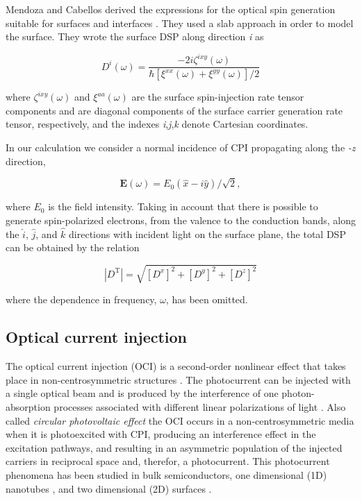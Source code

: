 \documentclass[aps,pra,11pt,tightenlines,showpacs,superscriptaddress,groupedaddress]{revtex4-1}
\begin{document}
Mendoza and Cabellos derived the expressions for the optical spin generation
suitable for surfaces and interfaces \cite{mendoza2012optical}. They used a
slab approach in order to model the surface. They wrote the surface DSP along
direction \emph{i} as

\begin{equation}
    D^{i}(\omega) = \frac{-2i \zeta^{ixy} (\omega)}{\hbar \left[
    \xi^{xx}(\omega) + \xi^{yy}(\omega) \right] /2 } \label{eq:D^i}
\end{equation}

\noindent where $\zeta^{ixy} (\omega)$ and $\xi^{aa}(\omega)$ are the surface
spin-injection rate tensor components and are diagonal components of the
surface carrier generation rate tensor, respectively, and the indexes
\emph{i},\emph{j},\emph{k} denote Cartesian coordinates.

In our calculation we consider a normal incidence of CPI propagating along the
\emph{-z} direction,

\begin{equation*}
    \mathbf{E} (\omega) = E_{0}(\hat{x} -i \hat{y})/\sqrt{2}, 
\end{equation*}


\noindent where $E_{0}$ is the field intensity. Taking in account that there is
possible to generate spin-polarized electrons, from the valence to the
conduction bands, along the $\hat{i}$, $\hat{j}$, and $\hat{k}$ directions with
incident light on the surface plane, the total DSP can be obtained by the
relation

\begin{equation*}
    |{D^{\text{T}}}| = \sqrt{ \left[ D^{x} \right]^{2} + \left[ D^{y}
    \right]^{2} + \left[ D^{z} \right]^{2} }
\end{equation*}

\noindent where the dependence in frequency, $\omega$, has been omitted.

    \subsection{Optical current injection}

The optical current injection (OCI) is a second-order nonlinear effect that
takes place in non-centrosymmetric structures \cite{nastos2006optical,
cabellos2011optical,bhat2005excitonic,fraser1999quantum}. The photocurrent can
be injected with a single optical beam and is produced by the interference of
one photon-absorption processes associated with different linear polarizations
of light \cite{sipe2000second}. Also called  \emph{circular photovoltaic
effect} the OCI occurs in a non-centrosymmetric media when it is photoexcited
with CPI, producing an interference effect in the excitation pathways, and
resulting in an asymmetric population of the injected carriers in reciprocal
space and, therefor, a photocurrent. This photocurrent phenomena has been
studied in bulk semiconductors, one dimensional (1D) nanotubes
\cite{mele2000coherent,kral2000photogalvanic}, and two dimensional (2D)
surfaces \cite{mele2000coherent}.
\end{document}
